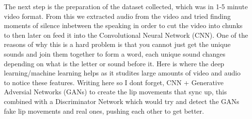 \documentclass[12pt]{article}
\begin{document}
The next step is the preparation of the dataset collected, which was in 1-5 minute video format. From this we extracted audio from the video and tried finding moments of silence inbetween the speaking in order to cut the video into chunks to then later on feed it into the Convolutional Neural Network (CNN).
One of the reasons of why this is a hard problem is that you cannot just get the unique sounds and join them together to form a word, each unique sound changes depending on what is the letter or sound before it. Here is where the deep learning/machine learning helps as it studites large amounts of video and audio to notice these features.
Writing here so I dont forget, CNN + Generative Adversial Networks (GANs) to create the lip movements that sync up, this combined with a Discriminator Network which would try and detect the GANs fake lip movements and real ones, pushing each other to get better.
\end{document}
